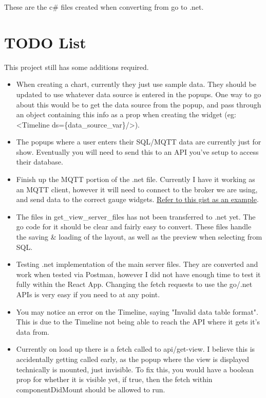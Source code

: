 \documentclass[12pt, titlepage]{article}
\begin{document}
These are the c\# files created when converting from go to .net.  

\section{TODO List}

This project still has some additions required.

\begin{itemize}
\item When creating a chart, currently they just use sample data. They should be updated to use whatever data source is entered in the popups. One way to go about this would be to get the data source from the popup, and pass through an object containing this info as a prop when creating the widget (eg: \textless Timeline ds=\{data\_source\_var\}/\textgreater).
\item The popups where a user enters their SQL/MQTT data are currently just for show. Eventually you will need to send this to an API you've setup to access their database.
\item Finish up the MQTT portion of the .net file. Currently I have it working as an MQTT client, however it will need to connect to the broker we are using, and send data to the correct gauge widgets. \href{https://gist.github.com/prabirshrestha/2765381}{Refer to this gist as an example}.
\item The files in get\_view\_server\_files has not been transferred to .net yet. The go code for it should be clear and fairly easy to convert. These files handle the saving \& loading of the layout, as well as the preview when selecting from SQL.
\item Testing .net implementation of the main server files. They are converted and work when tested via Postman, however I did not have enough time to test it fully within the React App. Changing the fetch requests to use the go/.net APIs is very easy if you need to at any point.   
\item You may notice an error on the Timeline, saying "Invalid data table format". This is due to the Timeline not being able to reach the API where it gets it's data from.
\item Currently on load up there is a fetch called to api/get-view. I believe this is accidentally getting called early, as the popup where the view is displayed technically is mounted, just invisible. To fix this, you would have a boolean prop for whether it is visible yet, if true, then the fetch within componentDidMount should be allowed to run.  
\end{itemize}
\end{document}
